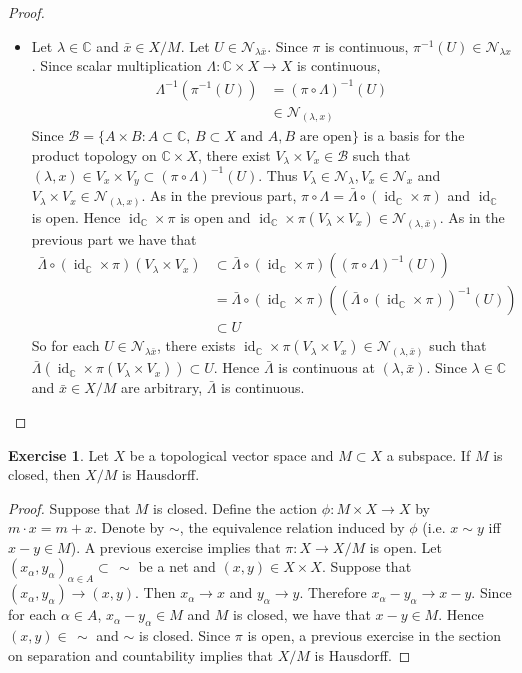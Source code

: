 \documentclass[12pt]{amsart}
\theoremstyle{definition}
\newtheorem{ex}[definition]{Exercise}
\newcommand{\al}{\alpha}
\newcommand{\lam}{\lambda}
\newcommand{\Lam}{\Lambda}
\newcommand{\C}{\mathbb{C}}
\newcommand{\MB}{\mathcal{B}}
\newcommand{\MN}{\mathcal{N}}
\DeclareMathOperator{\id}{id}
\DeclareMathOperator*{\0}{\mbf{0}}
\DeclareMathOperator*{\1}{\mbf{1}}
\begin{document}
\begin{proof}
\begin{itemize}
			\item Let $\lam \in \C$ and $\bar{x} \in X / M$. Let $U \in \MN_{\lam \bar{x}}$. Since $\pi$ is continuous, $\pi^{-1}(U) \in \MN_{\lam x}$. Since scalar multiplication $\Lam: \C \times X  \rightarrow X$ is continuous, 
			\begin{align*}
				\Lam^{-1}(\pi^{-1}(U)) 
				& = (\pi \circ \Lam)^{-1}( U) \\
				& \in \MN_{(\lam, x)}
			\end{align*} 
			Since $\MB = \{A \times B: \text{$A \subset \C$, $B \subset X$ and $A,B$ are open}\}$ is a basis for the product topology on $\C \times X$, there exist $V_{\lam} \times V_x \in \MB$ such that $(\lam,x) \in V_x \times V_y \subset  (\pi \circ \Lam)^{-1}(U)$. Thus $V_{\lam} \in \MN_{\lam}, V_x \in \MN_x$ and $V_{\lam} \times V_x \in \MN_{(\lam, x)}$. As in the previous part, $\pi \circ \Lam = \bar{\Lam} \circ (\id_{\C} \times \pi)$ and $\id_{\C}$ is open. Hence $\id_{\C} \times \pi$ is open and $\id_{\C} \times \pi (V_{\lam} \times V_x) \in \MN_{(\lam, \bar{x})}$. As in the previous part we have that 
			\begin{align*}
				\bar{\Lam} \circ (\id_{\C} \times \pi) (V_{\lam} \times V_x) 
				& \subset \bar{\Lam} \circ (\id_{\C} \times \pi)((\pi \circ \Lam)^{-1}(U)) \\
				& = \bar{\Lam} \circ (\id_{\C} \times \pi)((\bar{\Lam} \circ (\id_{\C} \times \pi))^{-1}(U)) \\
				& \subset U
			\end{align*} 
			So for each $U \in \MN_{\lam\bar{x}}$, there exists $\id_{\C} \times \pi(V_{\lam} \times V_x) \in \MN_{(\lam, \bar{x})}$ such that $\bar{\Lam}(\id_{\C} \times \pi(V_{\lam} \times V_x)) \subset U$. Hence $\bar{\Lam}$ is continuous at $(\lam, \bar{x})$. Since $\lam \in \C$ and $\bar{x} \in X/ M$ are arbitrary, $\bar{\Lam}$ is continuous. 
		\end{itemize}
	\end{proof}

	\begin{ex}
		Let $X$ be a topological vector space and $M \subset X$ a subspace. If $M$ is closed, then $X / M$ is Hausdorff. 
	\end{ex}
	
	\begin{proof}
		Suppose that $M$ is closed. Define the action $\phi: M \times X \rightarrow X$ by $m \cdot x = m  + x$. Denote by $\sim$, the equivalence relation induced by $\phi$ (i.e. $x \sim y$ iff $x-y \in M$). A previous exercise implies that $\pi: X \rightarrow X /M$ is open. Let $(x_{\al},y_{\al})_{\al \in A} \subset \, \sim$ be a net and $(x,y) \in X \times X$. Suppose that $(x_{\al},y_{\al}) \rightarrow (x,y)$. Then $x_{\al} \rightarrow x$ and $y_{\al} \rightarrow y$. Therefore $x_{\al} - y_{\al} \rightarrow x -y$. Since for each $\al \in A$, $x_{\al} - y_{\al} \in M$ and $M$ is closed, we have that $x -y \in M$. Hence $(x,y) \in \, \sim$ and $\sim$ is closed. Since $\pi$ is open, a previous exercise in the section on separation and countability implies that $X / M$ is Hausdorff.
	\end{proof}
	
\end{document}
